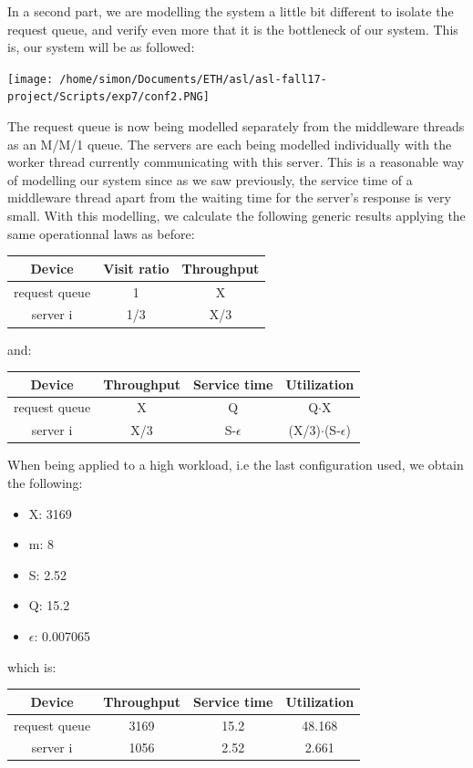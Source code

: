 \documentclass[11pt,a4paper]{article}
\begin{document}
In a second part, we are modelling the system a little bit different to isolate the request queue, and verify even more that it is the bottleneck of our system. This is, our system will be as followed:
\begin{center} 
\texttt{[image: /home/simon/Documents/ETH/asl/asl-fall17-project/Scripts/exp7/conf2.PNG]}
\end{center} 
The request queue is now being modelled separately from the middleware threads as an M/M/1 queue. The servers are each being modelled individually with the worker thread currently communicating with this server. This is a reasonable way of modelling our system since as we saw previously, the service time of a middleware thread apart from the waiting time for the server's response is very small. With this modelling, we calculate the following generic results applying the same operationnal laws as before:
 \begin{center}
		\begin{tabular}{|c|c|c|}
			  \hline
			  \textbf{Device} & \textbf{Visit ratio} & \textbf{Throughput} \\
			  \hline
			  request queue & 1 & X \\
			  server i & 1/3 & X/3   \\
			  \hline
		\end{tabular}
 \end{center}
 and:
 \begin{center}

		\begin{tabular}{|c|c|c|c|}
			  \hline
			  \textbf{Device} & \textbf{Throughput} & \textbf{Service time} & \textbf{Utilization} \\
			  \hline
			  request queue  &X  & Q  & Q$\cdot$X\\
			  server i & X/3 & S-\(\epsilon \) &(X/3)$\cdot$(S-\(\epsilon \))  \\
			  \hline
		\end{tabular}
 \end{center}
 When being applied to a high workload, i.e the last configuration used, we obtain the following:
 \begin{itemize}
\item X: 3169
\item m: 8
\item S: 2.52
\item Q: 15.2
\item \(\epsilon \): 0.007065
\end{itemize}
which is:
 \begin{center}

		\begin{tabular}{|c|c|c|c|}
			  \hline
			  \textbf{Device} & \textbf{Throughput} & \textbf{Service time} & \textbf{Utilization} \\
			  \hline
			  request queue  &3169  & 15.2  &48.168 \\
			  server i & 1056 & 2.52 &2.661 \\
			  \hline
		\end{tabular}
 \end{center}
\end{document}
